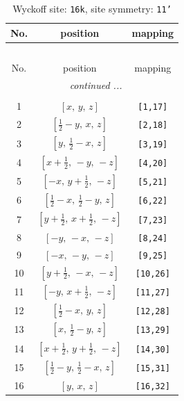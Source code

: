 \documentclass[fleqn,8pt]{jsarticle}
\begin{document}
\begin{longtable}{ccc}
\caption{Wyckoff site: {\tt 16k}, site symmetry: {\tt 11'}}
 \\
 \hline \hline
No. & position & mapping \\ \hline \endfirsthead

\multicolumn{2}{l}{\tablename\ \thetable{}} \\
 \hline \hline
No. & position & mapping \\ \hline \endhead

 \hline \hline
\multicolumn{2}{r}{\footnotesize\it continued ...} \\ \endfoot

 \hline \hline
\multicolumn{2}{r}{} \\ \endlastfoot

1 & $\left[ x,\, y,\, z \right]$ & {\tt [1,17]} \\ \hline
2 & $\left[ \frac{1}{2} - y,\, x,\, z \right]$ & {\tt [2,18]} \\ \hline
3 & $\left[ y,\, \frac{1}{2} - x,\, z \right]$ & {\tt [3,19]} \\ \hline
4 & $\left[ x + \frac{1}{2},\, - y,\, - z \right]$ & {\tt [4,20]} \\ \hline
5 & $\left[ - x,\, y + \frac{1}{2},\, - z \right]$ & {\tt [5,21]} \\ \hline
6 & $\left[ \frac{1}{2} - x,\, \frac{1}{2} - y,\, z \right]$ & {\tt [6,22]} \\ \hline
7 & $\left[ y + \frac{1}{2},\, x + \frac{1}{2},\, - z \right]$ & {\tt [7,23]} \\ \hline
8 & $\left[ - y,\, - x,\, - z \right]$ & {\tt [8,24]} \\ \hline
9 & $\left[ - x,\, - y,\, - z \right]$ & {\tt [9,25]} \\ \hline
10 & $\left[ y + \frac{1}{2},\, - x,\, - z \right]$ & {\tt [10,26]} \\ \hline
11 & $\left[ - y,\, x + \frac{1}{2},\, - z \right]$ & {\tt [11,27]} \\ \hline
12 & $\left[ \frac{1}{2} - x,\, y,\, z \right]$ & {\tt [12,28]} \\ \hline
13 & $\left[ x,\, \frac{1}{2} - y,\, z \right]$ & {\tt [13,29]} \\ \hline
14 & $\left[ x + \frac{1}{2},\, y + \frac{1}{2},\, - z \right]$ & {\tt [14,30]} \\ \hline
15 & $\left[ \frac{1}{2} - y,\, \frac{1}{2} - x,\, z \right]$ & {\tt [15,31]} \\ \hline
16 & $\left[ y,\, x,\, z \right]$ & {\tt [16,32]} \\
\end{longtable}
\end{document}
